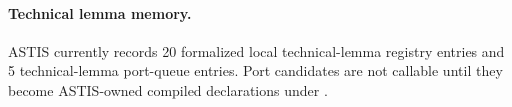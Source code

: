 \paragraph{Technical lemma memory.}
ASTIS currently records 20 formalized local technical-lemma
registry entries and 5 technical-lemma port-queue entries.  Port
candidates are not callable until they become ASTIS-owned compiled
declarations under .

